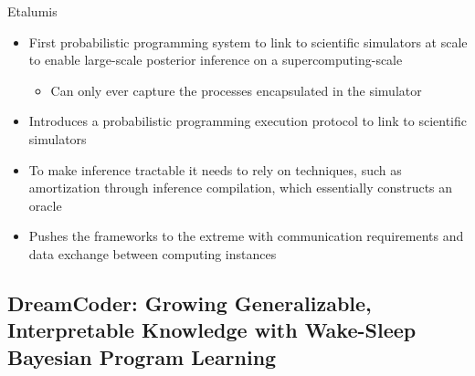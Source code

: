\documentclass[AERbeamer%
              ,optEnglish%
              ,optBiber%
              ,optBibstyleAlphabetic%
              ,optBeamerClassicFormat%
              ]{AERlatex}%
\begin{document}
\begin{frame}[c]{Etalumis}
    \centering
    \begin{itemize}
        \item First probabilistic programming system to link to scientific simulators at scale to enable large-scale
              posterior inference on a supercomputing-scale
        \begin{itemize}
            \item Can only ever capture the processes encapsulated in the simulator
        \end{itemize}
        \item Introduces a probabilistic programming execution protocol to link to scientific simulators
        \item To make inference tractable it needs to rely on techniques, such as amortization through inference
              compilation, which essentially constructs an oracle
        \item Pushes the frameworks to the extreme with communication requirements and data exchange between computing instances
    \end{itemize}
\end{frame}



\subsection{DreamCoder: Growing Generalizable, Interpretable Knowledge with Wake-Sleep Bayesian Program Learning}
\end{document}
